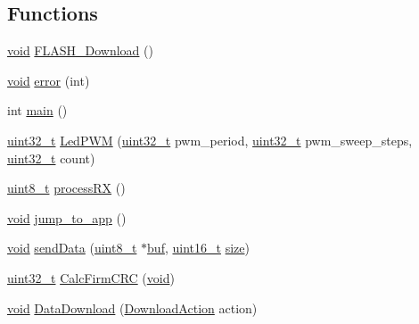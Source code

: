 \subsection*{Functions}
\begin{DoxyCompactItemize}
\item 
\hyperlink{group___n_a_m_e_ga18028b8badbf1ea7e704ccac3c488e82}{void} \hyperlink{group___open_pilot_b_l_ga7ec2ca9d0a908d6508dbc58c00eb18ec}{F\-L\-A\-S\-H\-\_\-\-Download} ()
\item 
\hyperlink{group___n_a_m_e_ga18028b8badbf1ea7e704ccac3c488e82}{void} \hyperlink{group___open_pilot_b_l_ga5879845a39e040157796c1d907f43d24}{error} (int)
\item 
int \hyperlink{group___open_pilot_b_l_gae66f6b31b5ad750f1fe042a706a4e3d4}{main} ()
\item 
\hyperlink{stdint_8h_a435d1572bf3f880d55459d9805097f62}{uint32\-\_\-t} \hyperlink{group___open_pilot_b_l_ga75e30c099232f21fa6e08353b0dfcef7}{Led\-P\-W\-M} (\hyperlink{stdint_8h_a435d1572bf3f880d55459d9805097f62}{uint32\-\_\-t} pwm\-\_\-period, \hyperlink{stdint_8h_a435d1572bf3f880d55459d9805097f62}{uint32\-\_\-t} pwm\-\_\-sweep\-\_\-steps, \hyperlink{stdint_8h_a435d1572bf3f880d55459d9805097f62}{uint32\-\_\-t} count)
\item 
\hyperlink{stdint_8h_aba7bc1797add20fe3efdf37ced1182c5}{uint8\-\_\-t} \hyperlink{group___open_pilot_b_l_ga37137877683fa8bb290bf36655ca2359}{process\-R\-X} ()
\item 
\hyperlink{group___n_a_m_e_ga18028b8badbf1ea7e704ccac3c488e82}{void} \hyperlink{group___open_pilot_b_l_ga4b30467c425c173f9ddf827491be666c}{jump\-\_\-to\-\_\-app} ()
\item 
\hyperlink{group___n_a_m_e_ga18028b8badbf1ea7e704ccac3c488e82}{void} \hyperlink{group___open_pilot_b_l_gaa1fa853082b4ce777706ba08c91fb0b8}{send\-Data} (\hyperlink{stdint_8h_aba7bc1797add20fe3efdf37ced1182c5}{uint8\-\_\-t} $\ast$\hyperlink{mavlink__helpers_8h_af5c51bef7cca88bcb22f0517fdb06153}{buf}, \hyperlink{stdint_8h_a273cf69d639a59973b6019625df33e30}{uint16\-\_\-t} \hyperlink{pios__opahrs__proto_8h_ae5dc6ffcd9b7605c7787791e40cc6bb0}{size})
\item 
\hyperlink{stdint_8h_a435d1572bf3f880d55459d9805097f62}{uint32\-\_\-t} \hyperlink{group___open_pilot_b_l_ga9eb702c0c89bbf54545553d141c5cfa6}{Calc\-Firm\-C\-R\-C} (\hyperlink{group___n_a_m_e_ga18028b8badbf1ea7e704ccac3c488e82}{void})
\item 
\hyperlink{group___n_a_m_e_ga18028b8badbf1ea7e704ccac3c488e82}{void} \hyperlink{group___open_pilot_b_l_ga33196f517628dd8e2149305b76d75f8e}{Data\-Download} (\hyperlink{group___copter_control_b_l_ga3758da4ce9164f008216ba0fc2a82edc}{Download\-Action} action)

\end{DoxyCompactItemize}
